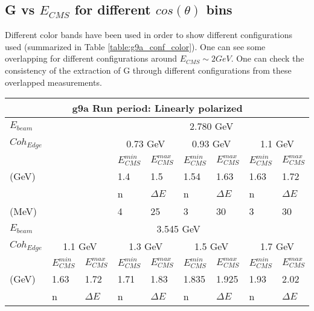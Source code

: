 \subsection{G vs \texorpdfstring{$E_{CMS}$}{E-CMS} for different \texorpdfstring{$cos(\theta)$}{cos(theta)} bins}
Different color bands have been used in order to show different configurations used (summarized in Table \ref{table:g9a_conf_color}). One can see some overlapping for different configurations around $E_{CMS} \sim 2 GeV$. One can check the consistency of the extraction of G through different configurations from these overlapped measurements. 
\begin{table}[h]
  \begin{center}
    \begin{tabular}{ |l||l|l||l|l||l|l||l|l||}
      \hline
      \multicolumn{9}{|c|}{g9a Run period: Linearly polarized } \\
      \hline
      \multicolumn{3}{|l||}{$E_{beam}$} & \multicolumn{6}{|c||}{2.780 GeV}   \\
      \hline
      \multicolumn{3}{|l||}{$Coh_{Edge}$} & \multicolumn{2}{|c||}{0.73 GeV} &  \multicolumn{2}{|c||}{0.93 GeV} &  \multicolumn{2}{|c||}{1.1 GeV}   \\
      \hline
      \multicolumn{3}{|l||}{} & $E_{CMS}^{min} $ &  $E_{CMS}^{max} $ & $E_{CMS}^{min} $ &  $E_{CMS}^{max} $ & $E_{CMS}^{min} $ &  $E_{CMS}^{max} $\\
      \multicolumn{3}{|l||}{(GeV)} & 1.4 & 1.5 & 1.54 & 1.63 & 1.63 & 1.72  \\
      \hline
      \multicolumn{3}{|l||}{} & n  &  $\Delta E$ & n  &  $\Delta E$ & n  &  $\Delta E$ \\
      \multicolumn{3}{|l||}{(MeV)} & 4 & 25 & 3 & 30 & 3 & 30  \\
      \hline
      \hline
      $E_{beam}$&  \multicolumn{8}{|c||}{3.545 GeV} \\
      \hline
      $Coh_{Edge}$&  \multicolumn{2}{|c||}{1.1 GeV} &  \multicolumn{2}{|c||}{1.3 GeV} &  \multicolumn{2}{|c||}{1.5 GeV} &  \multicolumn{2}{|c||}{1.7 GeV} \\
      \hline
      & $E_{CMS}^{min} $ &  $E_{CMS}^{max} $& $E_{CMS}^{min} $ &  $E_{CMS}^{max} $ & $E_{CMS}^{min} $ &  $E_{CMS}^{max} $ & $E_{CMS}^{min} $ &  $E_{CMS}^{max} $ \\
      (GeV) & 1.63 & 1.72 & 1.71 & 1.83 & 1.835 & 1.925 &  1.93 & 2.02 \\
      \hline
      & n  &  $\Delta E$ & n  &  $\Delta E$ & n  &  $\Delta E$& n  &  $\Delta E$ \\

\end{tabular}
\end{center}
\end{table}
